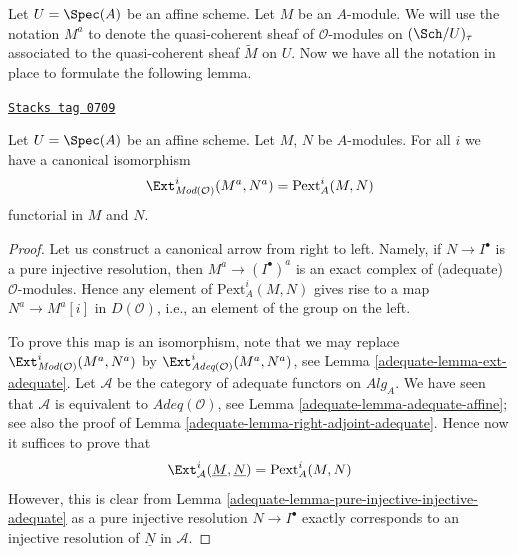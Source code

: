 Let $U = \Spec(A)$ be an affine scheme. Let $M$ be an $A$-module.
We will use the notation $M^a$ to denote the quasi-coherent sheaf
of $\mathcal{O}$-modules on $(\Sch/U)_\tau$ associated to
the quasi-coherent sheaf $\widetilde{M}$ on $U$.
Now we have all the notation in place to formulate the following lemma.

\begin{lemma}
\label{adequate-lemma-big-ext}
\href{https://stacks.math.columbia.edu/tag/0709}{\texttt{Stacks tag 0709}}

Let $U = \Spec(A)$ be an affine scheme. Let $M$, $N$ be $A$-modules.
For all $i$ we have a canonical isomorphism
$$
\Ext^i_{\textit{Mod}(\mathcal{O})}(M^a, N^a) = \text{Pext}^i_A(M, N)
$$
functorial in $M$ and $N$.
\end{lemma}

\begin{proof}

Let us construct a canonical arrow from right to left. Namely, if
$N \to I^\bullet$ is a pure injective resolution, then
$M^a \to (I^\bullet)^a$ is an exact complex of (adequate)
$\mathcal{O}$-modules. Hence any element of $\text{Pext}^i_A(M, N)$
gives rise to a map $N^a \to M^a[i]$ in $D(\mathcal{O})$, i.e.,
an element of the group on the left.

\medskip\noindent
To prove this map is an isomorphism, note that we may replace
$\Ext^i_{\textit{Mod}(\mathcal{O})}(M^a, N^a)$ by
$\Ext^i_{\textit{Adeq}(\mathcal{O})}(M^a, N^a)$, see
Lemma \ref{adequate-lemma-ext-adequate}.
Let $\mathcal{A}$ be the category of adequate functors
on $\textit{Alg}_A$. We have seen that $\mathcal{A}$ is
equivalent to $\textit{Adeq}(\mathcal{O})$, see
Lemma \ref{adequate-lemma-adequate-affine}; see also the proof of
Lemma \ref{adequate-lemma-right-adjoint-adequate}.
Hence now it suffices to prove that
$$
\Ext^i_\mathcal{A}(\underline{M}, \underline{N}) =
\text{Pext}^i_A(M, N)
$$
However, this is clear from
Lemma \ref{adequate-lemma-pure-injective-injective-adequate}
as a pure injective resolution $N \to I^\bullet$ exactly corresponds
to an injective resolution of $\underline{N}$ in $\mathcal{A}$.
\end{proof}

